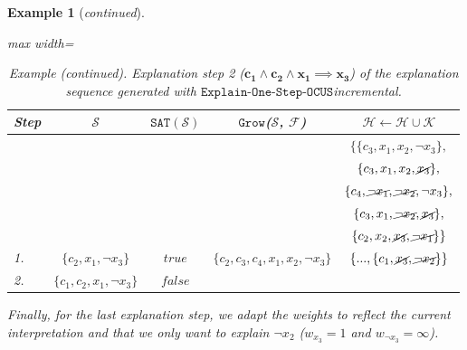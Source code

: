 \documentclass[twoside,11pt]{article}
\newcommand\m[1]{\mathcal{#1}}
\newtheorem{example}{Example}
\newcommand\setstohit{\ensuremath{\m{H} }\xspace}
\newcommand\formula{\ensuremath{\m{F} }\xspace}
\newcommand\mm[1]{\ensuremath{#1}\xspace}
\newcommand\call[1]{\mm{\texttt{#1}}}
\newcommand\sat{\texttt{{SAT}}\xspace}
\newcommand\grow{\mm{\call{Grow}}}
\newcommand\onestepo{\ensuremath{\call{Explain-One-Step-OCUS}}\xspace}
\begin{document}
\begin{example}[\textit{continued}]
\begin{table}[!h]
	\centering
	\begin{adjustbox}{max width=\textwidth}
		\begin{tabular}{lcccc} 
			Step & $\m{S}$                             & $\sat(\m{S})$    &          \grow($\m{S}$, $\formula$)                & $\setstohit  \gets \setstohit  \cup \m{K}      $ \\ \toprule[2pt]
			&    &  &     &  $\{ \{c_3, {x_1}, x_2, \lnot x_3 \}, $                                \\
			&    &  &     &  $\{c_3, {x_1} , x_2 , \cancel{x_3}\}, $                                \\
			&    &  &     &  $\{c_4, \cancel{\lnot x_1} ,\cancel{\lnot x_2} , \lnot x_3\}, $                                \\
			&    &  &     &  $\{c_3, {x_1} , \cancel{\lnot x_2} , \cancel{x_3}\}, $                                \\
			&    &  &     &  $\{c_2, x_2, \cancel{x_3},  \cancel{\lnot x_1}\}\} $                                \\\midrule
			1. &  $\{ c_2 ,x_1, \lnot x_3\}$  & $\mathit{true}$ & $\{ c_2, c_3, c_4,  x_1 , x_2, \lnot x_3 \}$    &  $\{..., \{ c_1, \cancel{x_3},  \cancel{\lnot x_2}\}\}$                                \\
			\midrule %
			2. &  $\{ c_1, c_2, x_1, \lnot x_3 \}$  & $\mathit{false}$ & \phantom{$\{c_1 , c_2 , c_4, \lnot x_1 , \lnot x_2 ,  \lnot x_3 \}$}   &                                 \\
		\end{tabular}
	\end{adjustbox}
	\caption{\textit{Example (continued)}. Explanation step 2 ($\mathbf{c_1 \wedge c_2 \wedge x_1 \implies x_3}$) of the explanation sequence generated with \onestepo \emph{incremental}. }
	\label{tab:example-explanation-generation:incr:step2}
\end{table}

Finally, for the last explanation step, we adapt the weights to reflect the current interpretation and that we only want to explain $\lnot x_2$ ($w_{x_3} = 1$ and $w_{\lnot x_3} = \infty$).


\end{example}
\end{document}
